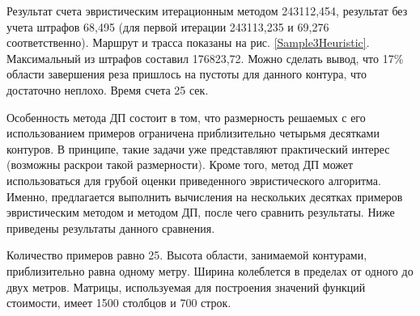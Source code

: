 \documentclass[11pt,twoside,openany]{report}
\begin{document}
{{Результат счета эвристическим итерационным методом 243112,454, результат
без учета штрафов 68,495 (для первой итерации 243113,235 и 69,276
соответственно).
Маршрут и трасса показаны на рис. \ref{Sample3Heuristic}.
Максимальный из штрафов составил 176823,72. Можно
сделать вывод, что 17\% области завершения реза пришлось на пустоты для
данного контура, что достаточно неплохо. Время счета 25 сек.

Особенность метода ДП состоит в том, что размерность решаемых с его
использованием примеров ограничена приблизительно четырьмя десятками контуров.
В принципе, такие задачи уже представляют практический интерес (возможны
раскрои такой размерности). Кроме того, метод ДП может использоваться для
грубой оценки приведенного эвристического алгоритма. Именно, предлагается
выполнить вычисления на нескольких десятках примеров эвристическим методом
и методом ДП, после чего сравнить результаты. Ниже приведены результаты
данного сравнения.

Количество примеров равно 25. Высота области, занимаемой контурами, приблизительно
равна одному метру. Ширина колеблется в пределах от одного до двух метров.
Матрицы, используемая для построения значений функций стоимости,
имеет 1500 столбцов и 700 строк.

}}
\end{document}
